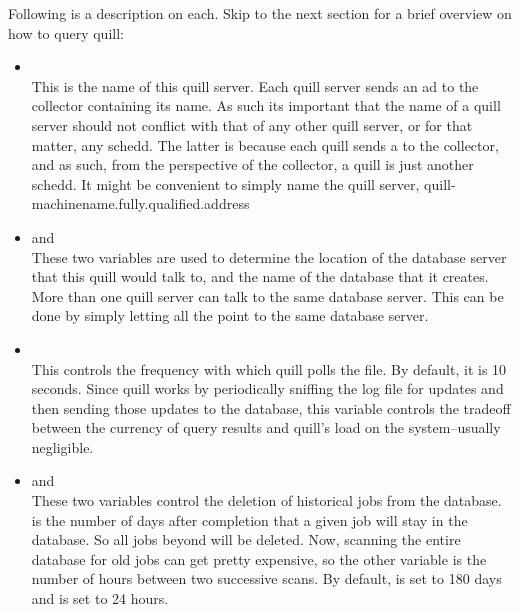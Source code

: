 \begin{enumerate}
Following is a description on each.  Skip to the next section for a brief 
overview on how to query quill:

\begin{itemize}
\item {}\\
This is the name of this quill server.  Each quill server sends an ad to
the collector containing its name.  As such its important that the name
of a quill server should not conflict with that of any other quill server,
or for that matter, any schedd.  The latter is because each quill sends a
 to the collector, and as such, from the perspective
of the collector, a quill is just another schedd. It might be convenient
to simply name the quill server, quill-machinename.fully.qualified.address

\item {} and \\
These two variables are used to determine the location of the database
server that this quill would talk to, and the name of the database that it
creates.  More than one quill server can talk to the same database server.
This can be done by simply letting all the 
point to the same database server.


\item {}\\
This controls the frequency with which quill polls the
 file.  By default, it is 10 seconds.  Since quill
works by periodically sniffing the log file for updates and then sending
those updates to the database, this variable controls the tradeoff between
the currency of query results and quill's load on the system--usually
negligible.

\item {} and 
		\\
These two variables control the deletion of historical jobs from the
database.   is the number of days
after completion that a given job will stay in the database.  So all
jobs beyond  will be deleted.  Now,
scanning the entire database for old jobs can get pretty expensive,
so the other variable 
is the number of hours between two successive scans.  By default,
 is set to 180 days and
 is set to 24 hours.


\end{itemize}
\end{enumerate}
